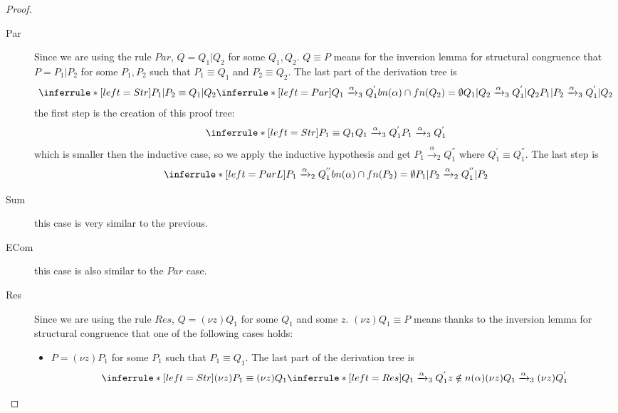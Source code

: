\begin{theorem}
\begin{proof}
\begin{description}
\begin{description}
\begin{itemize}
\begin{description}
		  \item[Par]
		    Since we are using the rule $Par$, $Q=Q_{1}|Q_{2}$ for some $Q_{1},Q_{2}$. $Q\equiv P$ means for the inversion lemma for structural congruence that $P=P_{1}|P_{2}$ for some $P_{1},P_{2}$ such that $P_{1}\equiv Q_{1}$ and $P_{2}\equiv Q_{2}$. The last part of the derivation tree is 
		    \[
		      \inferrule* [left=Str]{
			  P_{1}|P_{2}\equiv Q_{1}|Q_{2}
			\\
			  \inferrule* [left=Par]{
			      Q_{1}\xrightarrow{\alpha}_{3}Q_{1}^{'}
			    \\
			      bn(\alpha)\cap fn(Q_{2})=\emptyset
			  }{
			    Q_{1}|Q_{2}\xrightarrow{\alpha}_{3}Q_{1}^{'}|Q_{2}
			  }
		      }{
			P_{1}|P_{2}\xrightarrow{\alpha}_{3}Q_{1}^{'}|Q_{2}
		      }
		    \]
		    the first step is the creation of this proof tree:
		    \[
			  \inferrule* [left=Str]{
			      P_{1}\equiv Q_{1}
			    \\
			      Q_{1}\xrightarrow{\alpha}_{3}Q_{1}^{'}
			  }{
			    P_{1}\xrightarrow{\alpha}_{3}Q_{1}^{'}
			  }
		    \]
		    which is smaller then the inductive case, so we apply the inductive hypothesis and get $P_{1}\xrightarrow{\alpha}_{2}Q_{1}^{''}$ where $Q_{1}^{'}\equiv Q_{1}^{''}$. The last step is 
		    \[
		      \inferrule* [left=ParL]{
			  P_{1}\xrightarrow{\alpha}_{2}Q_{1}^{''}
			\\
			  bn(\alpha)\cap fn(P_{2})=\emptyset
		      }{
			P_{1}|P_{2}\xrightarrow{\alpha}_{2}Q_{1}^{''}|P_{2}
		      }
		    \]
		  \item[Sum] this case is very similar to the previous.
		  \item[ECom] this case is also similar to the $Par$ case.
		  \item[Res]
		    Since we are using the rule $Res$, $Q=(\nu z)Q_{1}$ for some $Q_{1}$ and some $z$. $(\nu z)Q_{1}\equiv P$ means thanks to the inversion lemma for structural congruence that one of the following cases holds:
                    \begin{itemize}
		      \item
			$P=(\nu z)P_{1}$ for some $P_{1}$ such that $P_{1}\equiv Q_{1}$. The last part of the derivation tree is 
			\[
			  \inferrule* [left=Str]{
			      (\nu z)P_{1}\equiv (\nu z)Q_{1}
			    \\
			      \inferrule* [left=Res]{
				  Q_{1}\xrightarrow{\alpha}_{3}Q_{1}^{'}
				\\
				  z\notin n(\alpha)
			      }{
				(\nu z)Q_{1}\xrightarrow{\alpha}_{3}(\nu z)Q_{1}^{'}
			      }
			  }{
}\]
\end{itemize}
\end{description}
\end{itemize}
\end{description}
\end{description}
\end{proof}
\end{theorem}
